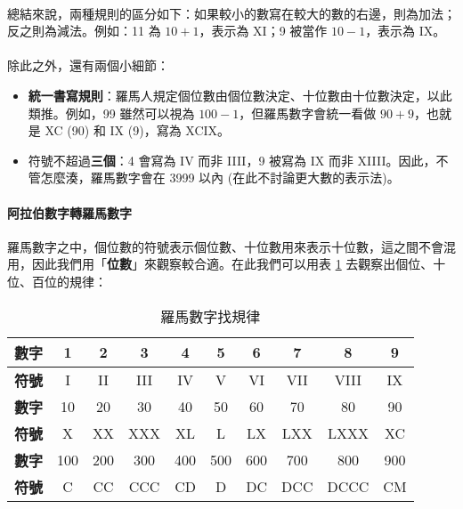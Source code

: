 \documentclass[12pt,a4paper,oneside]{report}
\begin{document}
\begin{CJK}{UTF8}{bkai}
\paragraph{}總結來說，兩種規則的區分如下：如果較小的數寫在較大的數的右邊，則為加法；反之則為減法。例如：11 為 $10+1$，表示為 XI；9 被當作 $10-1$，表示為 IX。
\paragraph{}除此之外，還有兩個小細節：

\begin{itemize}
\item \textbf{統一書寫規則}：羅馬人規定個位數由個位數決定、十位數由十位數決定，以此類推。例如，99 雖然可以視為 $100-1$，但羅馬數字會統一看做 $90+9$，也就是 XC (90) 和 IX (9)，寫為 XCIX。
\item 符號不超過\textbf{三個}：4 會寫為 IV 而非 IIII，9 被寫為 IX 而非 XIIII。因此，不管怎麼湊，羅馬數字會在 3999 以內 (在此不討論更大數的表示法)。
\end{itemize}

\paragraph{阿拉伯數字轉羅馬數字}羅馬數字之中，個位數的符號表示個位數、十位數用來表示十位數，這之間不會混用，因此我們用「{\color{red}\textbf{位數}}」來觀察較合適。在此我們可以用表 \ref{string:mani:table:roman:number:regular} 去觀察出個位、十位、百位的規律：

\begin{table}[h!]
  \centering
  \begin{tabular}{|c||c|c|c|c|c|c|c|c|c|}
  \hline
  \textbf{數字} & 1 & 2 & 3 & 4 & 5 & 6 & 7 & 8 & 9\\
  \hline
  \textbf{符號} & I & II & III & IV & V & VI & VII & VIII & IX\\
  \hline
  \hline
  \textbf{數字} & 10 & 20 & 30 & 40 & 50 & 60 & 70 & 80 & 90\\
  \hline
  \textbf{符號} & X & XX & XXX & XL & L & LX & LXX & LXXX & XC\\
  \hline
  \hline
  \textbf{數字} & 100 & 200 & 300 & 400 & 500 & 600 & 700 & 800 & 900\\
  \hline
  \textbf{符號} & C & CC & CCC & CD & D & DC & DCC & DCCC & CM\\
  \hline
  \end{tabular}
  \caption{羅馬數字找規律}
  \label{string:mani:table:roman:number:regular}
\end{table}


\end{CJK}
\end{document}
